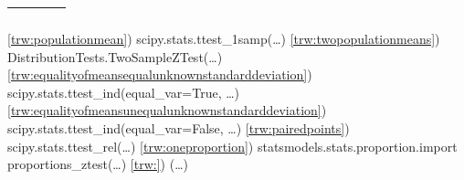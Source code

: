 \documentclass{article}
\begin{document}
\begin{topcaptiontable}
\begin{tabular}{|N|p{1.25in}|p{3.08in}|p{1.2in}|}
\begin{nospacebulletedlist}
				\end{nospacebulletedlist} &
				 \\ \hline
        \end{tabular}
    \end{topcaptiontable}

	\begin{code}{}
		\codeitem \ref{trw:populationmean}) scipy.stats.ttest\_1samp(\ldots)
		\codeitem \ref{trw:twopopulationmeans}) DistributionTests.TwoSampleZTest(\ldots)
		\codeitem \ref{trw:equalityofmeansequalunknownstandarddeviation}) scipy.stats.ttest\_ind(equal\_var=True, \ldots)
		\codeitem \ref{trw:equalityofmeansunequalunknownstandarddeviation}) scipy.stats.ttest\_ind(equal\_var=False, \ldots)
		\codeitem \ref{trw:pairedpoints}) scipy.stats.ttest\_rel(\ldots)
		\codeitem \ref{trw:oneproportion}) statsmodels.stats.proportion.import proportions\_ztest(\ldots)
		\codeitem \ref{trw:}) (\ldots)
	\end{code} 
\end{document}
